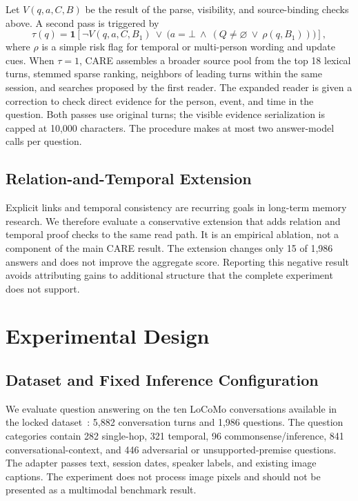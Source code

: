 \documentclass[11pt]{article}
\newcommand{\care}{\textsc{CARE}}
\newcommand{\botans}{\bot}
\begin{document}
Let $V(q,a,C,B)$ be the result of the parse, visibility, and source-binding
checks above. A second pass is triggered by
\begin{equation}
\tau(q)=\mathbf{1}\!\left[
\neg V(q,a,C,B_1)\ \lor\
\bigl(a=\botans\ \land\ (Q\neq\varnothing\ \lor\ \rho(q,B_1))\bigr)
\right],
\label{eq:gate}
\end{equation}
where $\rho$ is a simple risk flag for temporal or multi-person wording and
update cues. When $\tau=1$, \care{} assembles a broader source pool from
the top 18 lexical turns, stemmed sparse ranking, neighbors of leading
turns within the same session, and searches proposed by the first reader.
The expanded reader is given a correction to check direct evidence for the
person, event, and time in the question. Both passes use original turns;
the visible evidence serialization is capped at 10,000 characters. The
procedure makes at most two answer-model calls per question.

\subsection{Relation-and-Temporal Extension}

Explicit links and temporal consistency are recurring goals in long-term
memory research. We therefore evaluate a conservative extension that adds relation and
temporal proof checks to the same read path. It is an empirical ablation,
not a component of the main \care{} result. The extension changes only 15
of 1,986 answers and does not improve the aggregate score. Reporting this
negative result avoids attributing gains to additional structure that the
complete experiment does not support.

\section{Experimental Design}
\label{sec:experiments}

\subsection{Dataset and Fixed Inference Configuration}

We evaluate question answering on the ten LoCoMo conversations available in
the locked dataset~\cite{maharana2024locomo}: 5,882 conversation turns and
1,986 questions. The question categories contain 282 single-hop, 321
temporal, 96 commonsense/inference, 841 conversational-context, and 446
adversarial or unsupported-premise questions. The adapter passes text,
session dates, speaker labels, and existing image captions. The experiment
does not process image pixels and should not be presented as a multimodal
benchmark result.
\end{document}
